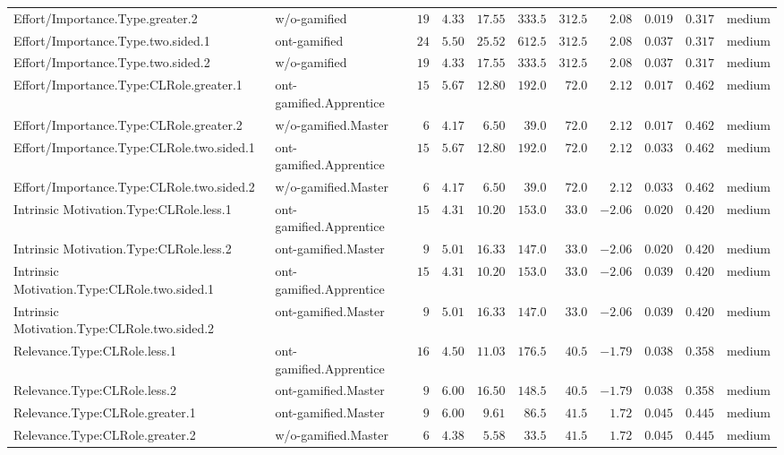 \documentclass[6pt,a4paper]{article}
\begin{document}
\begin{landscape}
{\begin{longtable}{llrrrrrrrrl}
Effort/Importance.Type.greater.2&w/o-gamified&$19$&$4.33$&$17.55$&$333.5$&$312.5$&$ 2.08$&$0.019$&$0.317$&medium\tabularnewline
Effort/Importance.Type.two.sided.1&ont-gamified&$24$&$5.50$&$25.52$&$612.5$&$312.5$&$ 2.08$&$0.037$&$0.317$&medium\tabularnewline
Effort/Importance.Type.two.sided.2&w/o-gamified&$19$&$4.33$&$17.55$&$333.5$&$312.5$&$ 2.08$&$0.037$&$0.317$&medium\tabularnewline
Effort/Importance.Type:CLRole.greater.1&ont-gamified.Apprentice&$15$&$5.67$&$12.80$&$192.0$&$ 72.0$&$ 2.12$&$0.017$&$0.462$&medium\tabularnewline
Effort/Importance.Type:CLRole.greater.2&w/o-gamified.Master&$ 6$&$4.17$&$ 6.50$&$ 39.0$&$ 72.0$&$ 2.12$&$0.017$&$0.462$&medium\tabularnewline
Effort/Importance.Type:CLRole.two.sided.1&ont-gamified.Apprentice&$15$&$5.67$&$12.80$&$192.0$&$ 72.0$&$ 2.12$&$0.033$&$0.462$&medium\tabularnewline
Effort/Importance.Type:CLRole.two.sided.2&w/o-gamified.Master&$ 6$&$4.17$&$ 6.50$&$ 39.0$&$ 72.0$&$ 2.12$&$0.033$&$0.462$&medium\tabularnewline
Intrinsic Motivation.Type:CLRole.less.1&ont-gamified.Apprentice&$15$&$4.31$&$10.20$&$153.0$&$ 33.0$&$-2.06$&$0.020$&$0.420$&medium\tabularnewline
Intrinsic Motivation.Type:CLRole.less.2&ont-gamified.Master&$ 9$&$5.01$&$16.33$&$147.0$&$ 33.0$&$-2.06$&$0.020$&$0.420$&medium\tabularnewline
Intrinsic Motivation.Type:CLRole.two.sided.1&ont-gamified.Apprentice&$15$&$4.31$&$10.20$&$153.0$&$ 33.0$&$-2.06$&$0.039$&$0.420$&medium\tabularnewline
Intrinsic Motivation.Type:CLRole.two.sided.2&ont-gamified.Master&$ 9$&$5.01$&$16.33$&$147.0$&$ 33.0$&$-2.06$&$0.039$&$0.420$&medium\tabularnewline
Relevance.Type:CLRole.less.1&ont-gamified.Apprentice&$16$&$4.50$&$11.03$&$176.5$&$ 40.5$&$-1.79$&$0.038$&$0.358$&medium\tabularnewline
Relevance.Type:CLRole.less.2&ont-gamified.Master&$ 9$&$6.00$&$16.50$&$148.5$&$ 40.5$&$-1.79$&$0.038$&$0.358$&medium\tabularnewline
Relevance.Type:CLRole.greater.1&ont-gamified.Master&$ 9$&$6.00$&$ 9.61$&$ 86.5$&$ 41.5$&$ 1.72$&$0.045$&$0.445$&medium\tabularnewline
Relevance.Type:CLRole.greater.2&w/o-gamified.Master&$ 6$&$4.38$&$ 5.58$&$ 33.5$&$ 41.5$&$ 1.72$&$0.045$&$0.445$&medium\tabularnewline
\hline
\end{longtable}}

\end{landscape}
\end{document}
